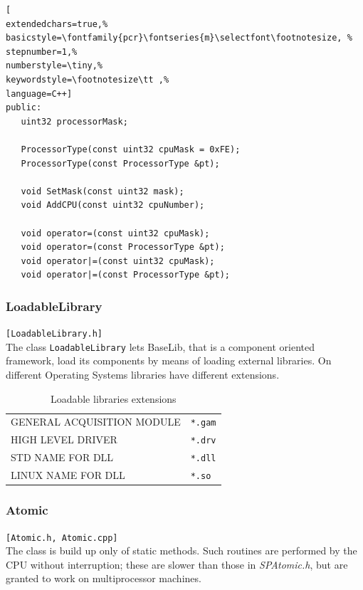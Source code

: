\begin{lstlisting}[
extendedchars=true,%
basicstyle=\fontfamily{pcr}\fontseries{m}\selectfont\footnotesize, %
stepnumber=1,%
numberstyle=\tiny,%
keywordstyle=\footnotesize\tt ,%
language=C++]
public:
   uint32 processorMask;

   ProcessorType(const uint32 cpuMask = 0xFE);
   ProcessorType(const ProcessorType &pt);

   void SetMask(const uint32 mask);
   void AddCPU(const uint32 cpuNumber);

   void operator=(const uint32 cpuMask);
   void operator=(const ProcessorType &pt);
   void operator|=(const uint32 cpuMask);
   void operator|=(const ProcessorType &pt);
\end{lstlisting}



\subsubsection{LoadableLibrary}
\texttt{[LoadableLibrary.h]}\\
The class \texttt{LoadableLibrary} lets BaseLib, that is a component oriented framework, load its components by means of loading external libraries. On different Operating Systems libraries have different extensions.

\begin{table}[!h]
 \begin{center}
  \begin{tabular}{|l|l|}
   \hline
    GENERAL ACQUISITION MODULE & \texttt{*.gam} \\
    HIGH LEVEL DRIVER & \texttt{*.drv} \\
    STD NAME FOR DLL & \texttt{*.dll} \\
    LINUX NAME FOR DLL & \texttt{*.so} \\
   \hline
   \end{tabular}
   \end{center}
  \caption{Loadable libraries extensions}
 \label{t:extensions}
\end{table}



\subsubsection{Atomic}
\texttt{[Atomic.h, Atomic.cpp]}\\
The class is build up only of static methods. Such routines are performed by the CPU without interruption; these are slower than those in \textit{SPAtomic.h}, but are granted to work on multiprocessor machines.

